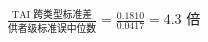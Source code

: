 \documentclass[border=3pt]{standalone}
\begin{document}
$\displaystyle \frac{\text{TAI 跨类型标准差}}{\text{供者级标准误中位数}} = \frac{0.1810}{0.0417} = \mathbf{4.3} \text{ 倍}$
\end{document}
